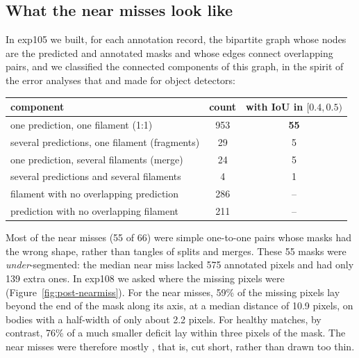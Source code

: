\subsection{What the near misses look like}\label{sec:post-nearmiss}
In exp105 we built, for each annotation record, the bipartite graph whose nodes are the predicted and
annotated masks and whose edges connect overlapping pairs, and we classified the connected components
of this graph, in the spirit of the error analyses that \citet{hoiem2012} and \citet{bolya2020tide}
made for object detectors:
\begin{center}\small
\begin{tabular}{@{}lcc@{}}
\toprule
component & count & with IoU in $[0.4, 0.5)$ \\
\midrule
one prediction, one filament (1:1) & 953 & \textbf{55} \\
several predictions, one filament (fragments) & 29 & 5 \\
one prediction, several filaments (merge) & 24 & 5 \\
several predictions and several filaments & 4 & 1 \\
filament with no overlapping prediction & 286 & -- \\
prediction with no overlapping filament & 211 & -- \\
\bottomrule
\end{tabular}
\end{center}
Most of the near misses (55 of 66) were simple one-to-one pairs whose masks had the wrong shape,
rather than tangles of splits and merges. These 55 masks were \emph{under}-segmented: the median
near miss lacked 575 annotated pixels and had only 139 extra ones. In exp108 we asked where the
missing pixels were (Figure~\ref{fig:post-nearmiss}). For the near misses, 59\% of the missing
pixels lay beyond the end of the mask along its axis, at a median distance of 10.9 pixels, on bodies
with a half-width of only about 2.2 pixels. For healthy matches, by contrast, 76\% of a much smaller
deficit lay within three pixels of the mask. The near misses were therefore mostly
, that is, cut short, rather than drawn too thin.

